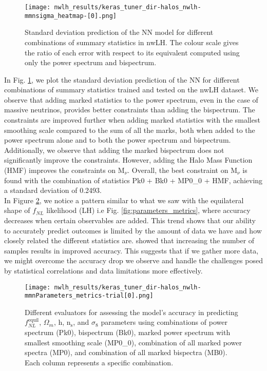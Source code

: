 \begin{figure}[htbp]
    \centering
    \texttt{[image: nwlh\_results/keras\_tuner\_dir-halos\_nwlh-mmnsigma\_heatmap-[0].png]}
    \caption{Standard deviation prediction of the NN model for different combinations of summary statistics in nwLH. The colour scale gives the ratio of each error with respect to its equivalent computed using only the power spectrum and bispectrum.}
    \label{fig:sigma_heatmap_nwlh}
\end{figure}

In Fig. \ref{fig:sigma_heatmap_nwlh}, we plot the standard deviation prediction of the NN for different combinations of summary statistics trained and tested on the nwLH dataset. We observe that adding marked statistics to the power spectrum, even in the case of massive neutrinos, provides better constraints than adding the bispectrum. The constraints are improved further when adding marked statistics with the smallest smoothing scale compared to the sum of all the marks, both when added to the power spectrum alone and to both the power spectrum and bispectrum. Additionally, we observe that adding the marked bispectrum does not significantly improve the constraints. However, adding the Halo Mass Function (HMF) improves the constraints on $\mathrm{M}_{\nu}$. Overall, the best constraint on $\mathrm{M}_{\nu}$ is found with the combination of statistics Pk0 + Bk0 + MP0\_0 + HMF, achieving a standard deviation of 0.2493.\\
In Figure \ref{fig:parameters_metrics_nwlh}, we notice a pattern similar to what we saw with the equilateral shape of $f_{NL}$ likelihood (LH) i.e Fig. \ref{fig:parameters_metrics}, where accuracy decreases when certain observables are added. This trend shows that our ability to accurately predict outcomes is limited by the amount of data we have and how closely related the different statistics are.
\cite{jung2024quijotepngoptimizingsummarystatistics} showed that increasing the number of samples results in improved accuracy. This suggests that if we gather more data, we might overcome the accuracy drop we observe and handle the challenges posed by statistical correlations and data limitations more effectively.
\begin{figure}[htbp]
    \centering
    \texttt{[image: nwlh\_results/keras\_tuner\_dir-halos\_nwlh-mmnParameters\_metrics-trial[0].png]}
    \caption {Different evaluators for assessing the model's accuracy in predicting $f_{NL}^{\mathrm{equil}}$, $\Omega_{m}$, $\mathrm{h}$, $\mathrm{n_{s}}$, and $\sigma_{8}$ parameters using combinations of power spectrum (Pk0), bispectrum (Bk0), marked power spectrum with smallest smoothing scale (MP0\_0), combination of all marked power spectra (MP0), and combination of all marked bispectra (MB0). Each column represents a specific combination.}
    \label{fig:parameters_metrics_nwlh}
\end{figure}


